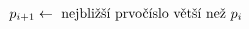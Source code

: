 \documentclass[preview]{standalone}
\begin{document}
\begin{align*}
&\hspace*{12pt}p_{i+1} \leftarrow \text{ nejbližší prvočíslo větší než } p_i
\end{align*}
\end{document}
